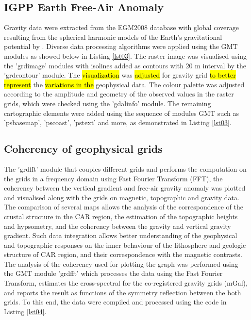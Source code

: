 \documentclass[minerals,article,submit,pdftex,moreauthors]{Definitions/mdpi}
\begin{document}
\subsection{IGPP Earth Free-Air Anomaly}
Gravity data were extracted from the EGM2008 database with global coverage resulting from the spherical harmonic models of the Earth's gravitational potential by \cite{Pavlis}. Diverse data processing algorithms were applied using the GMT modules as showed below in Listing \ref{lst03}. The raster image was visualised using the 'grdimage' modules with isolines added as contours with 20 m interval by the 'grdcontour' module. The \hl{visualization} was\hl{ adjusted }for gravity grid \hl{to better represent} the \hl{variations in the }geophysical data. The colour palette was adjusted according to the amplitude and geometry of the observed values in the raster grids, which were checked using the 'gdalinfo' module. The remaining cartographic elements were added using the sequence of modules GMT such as 'psbasemap', 'pscoast', 'pstext' and more, as demonstrated in Listing \ref{lst03}.

\subsection{Coherency of geophysical grids}

The 'grdfft' module that couples different grids and performs the computation on the grids in a frequency domain using Fast Fourier Transform (FFT), the coherency between the vertical gradient and free-air gravity anomaly was plotted and visualised along with the grids on magnetic, topographic and gravity data. The comparison of several maps allows the analysis of the correspondence of the crustal structure in the CAR region, the estimation of the topographic heights and hypsometry, and the coherency between the gravity and vertical gravity gradient. Such data integration allows better understanding of the geophysical and topographic responses on the inner behaviour of the lithosphere and geologic structure of CAR region, and their correspondence with the magnetic contrasts. The analysis of the coherency used for plotting the graph was performed using the GMT module 'grdfft' which processes the data using the Fast Fourier Transform, estimates the cross-spectral for the co-registered gravity grids (mGal), and reports the result as functions of the symmetry reflection between the both grids. To this end, the data were compiled and processed using the code in Listing \ref{lst04}. 
\end{document}
